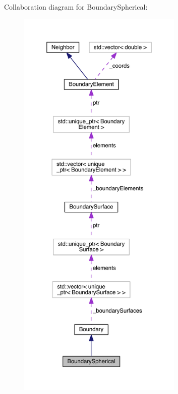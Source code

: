 Collaboration diagram for Boundary\+Spherical\+:\nopagebreak
\begin{figure}[H]
\begin{center}
\leavevmode
\includegraphics[height=550pt]{classBoundarySpherical__coll__graph}
\end{center}
\end{figure}
